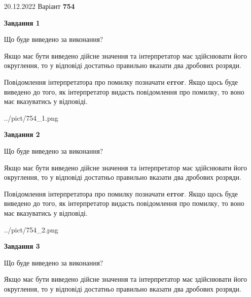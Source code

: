 \documentclass[12pt, ukrainian]{article}
\begin{document}
{20.12.2022 Варіант \No \textbf { 754 }\par}
{
\begin {Large}

{\begin {center}\textbf{Завдання 1}\end {center}}\par
Що буде виведено за виконання? \par

Якщо має бути виведено дійсне значення та інтерпретатор має здійснювати його округлення, 
то у відповіді достатньо правильно вказати два дробових розряди.

Повідомлення інтерпретатора про помилку позначати \textbf{error}.
Якщо щось буде виведено до того, як інтерпретатор видасть повідомлення про помилку, 
то воно має вказуватись у відповіді. \par

\begin{center}
	{../pict/754_1.png}
\end{center}
\newpage

{\begin {center}\textbf{Завдання 2}\end {center}}\par
Що буде виведено за виконання? \par

Якщо має бути виведено дійсне значення та інтерпретатор має здійснювати його округлення, 
то у відповіді достатньо правильно вказати два дробових розряди.

Повідомлення інтерпретатора про помилку позначати \textbf{error}.
Якщо щось буде виведено до того, як інтерпретатор видасть повідомлення про помилку, 
то воно має вказуватись у відповіді. \par

\begin{center}
	{../pict/754_2.png}
\end{center}
\newpage

{\begin {center}\textbf{Завдання 3}\end {center}}\par
Що буде виведено за виконання? \par

Якщо має бути виведено дійсне значення та інтерпретатор має здійснювати його округлення, 
то у відповіді достатньо правильно вказати два дробових розряди.


\end{Large}}
\end{document}
